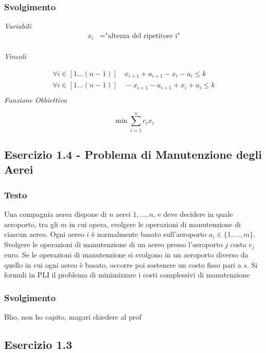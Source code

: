\subsubsection{Svolgimento}

\textit{Variabili}
\[
    \begin{aligned}
        x_i &= \text{"altezza del ripetitore i"}    \\
    \end{aligned}
\]



\textit{Vincoli}

\[
    \begin{aligned}
        \forall i\in[1\dots (n-1)] \quad x_{i+1} + a_{i+1} - x_{i} - a_{i} \leq k\\
        \forall i\in[1\dots (n-1)] \quad - x_{i+1} - a_{i+1} + x_{i} + a_{i} \leq k\\
    \end{aligned}
\]
\textit{Funzione Obbiettivo}

\[
    \min \sum_{i=1}^{n} c_i x_i
\]

\subsection{Esercizio 1.4 - Problema di Manutenzione degli Aerei}
\subsubsection{Testo}
Una compagnia aerea dispone di \( n \) aerei \( 1, \ldots, n \), e deve decidere in quale aeroporto, tra gli \( m \) in cui opera, svolgere le operazioni di manutenzione di ciascun aereo. Ogni aereo \( i \) è normalmente basato sull'aeroporto \( a_i \in \{1, \ldots, m\} \). Svolgere le operazioni di manutenzione di un aereo presso l'aeroporto \( j \) costa \( c_j \) euro. Se le operazioni di manutenzione si svolgono in un aeroporto diverso da quello in cui ogni aereo è basato, occorre poi sostenere un costo fisso pari a \( s \). Si formuli in PLI il problema di minimizzare i costi complessivi di manutenzione

\subsubsection{Svolgimento}

Bho, non ho capito, magari chiedere al prof


\subsection{Esercizio 1.3}
